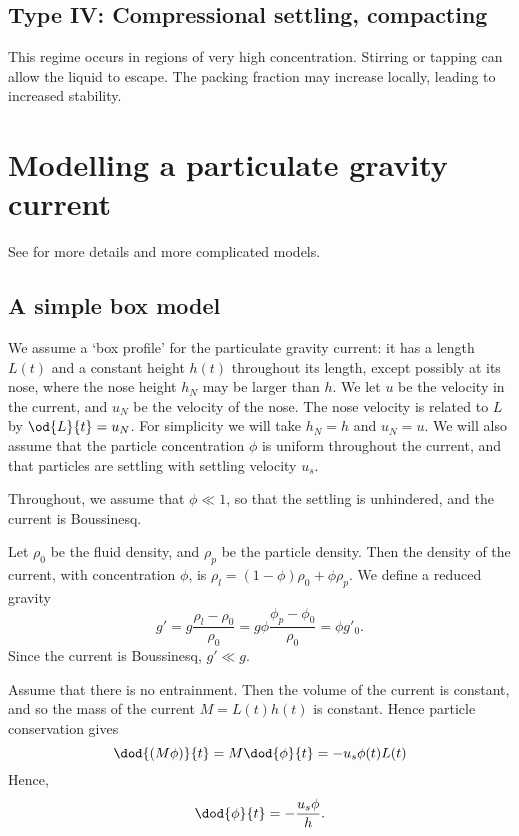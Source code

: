 \subsection{Type IV: Compressional settling, compacting}

This regime occurs in regions of very high concentration. Stirring or tapping can allow the liquid to escape. The packing fraction may increase locally, leading to increased stability.  

\section{Modelling a particulate gravity current}

See \cite{huppert-1998} for more details and more complicated models.

\subsection{A simple box model}
We assume a `box profile' for the particulate gravity current: it has a length
$L(t)$ and a constant height $h(t)$ throughout its length, except possibly at
its nose, where the nose height $h_N$ may be larger than $h$. We let $u$ be the
velocity in the current, and $u_N$ be the velocity of the nose. The nose
velocity is related to $L$ by $\od{L}{t} = u_N$. For simplicity we will take
$h_N = h$ and $u_N = u$. We will also assume that the particle concentration
$\phi$ is uniform throughout the current, and that particles are settling with
settling velocity $u_s$.  

Throughout, we assume that $\phi\ll1$, so that the settling is unhindered, and the current is Boussinesq. 

Let $\rho_0$ be the fluid density, and $\rho_p$ be the particle density. Then the density of the current, with concentration $\phi$, is $\rho_l = (1-\phi)\rho_0 + \phi \rho_p$. We define a reduced gravity
\begin{equation}
g' = g \frac{\rho_l - \rho_0}{\rho_0} = g\phi\frac{\phi_p - \phi_0}{\rho_0} = \phi g'_0.
\end{equation} 
Since the current is Boussinesq, $g' \ll g$. 

Assume that there is no entrainment. Then the volume of the current is constant, and so the mass of the current $M = L(t)h(t)$ is constant. Hence particle conservation gives
\begin{equation}
\dod{(M\phi)}{t} = M\dod{\phi}{t} = -u_s \phi(t) L(t)
\end{equation}
Hence,
\begin{equation}
\dod{\phi}{t} = -\frac{u_s \phi}{h}.
\end{equation}

